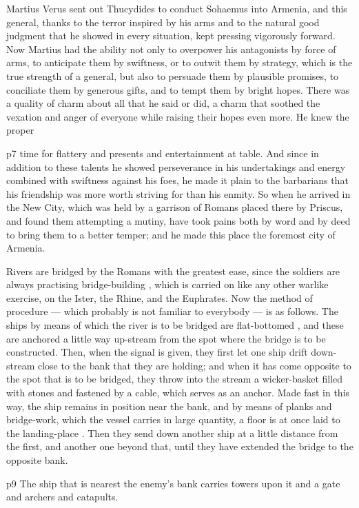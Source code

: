 Martius Verus sent out Thucydides to conduct Sohaemus into Armenia, and this general, thanks to the terror inspired by his arms and to the natural good judgment that he showed in every situation, kept pressing vigorously forward. Now Martius had the ability not only to overpower his antagonists by force of arms, to anticipate them by swiftness, or to outwit them by strategy, which is the true strength of a general, but also to persuade them by plausible promises, to conciliate them by generous gifts, and to tempt them by bright hopes. There was a quality of charm about all that he said or did, a charm that soothed the vexation and anger of everyone while raising their hopes even more. He knew the proper

p7 time for flattery and presents and entertainment at table. And since in addition to these talents he showed perseverance in his undertakings and energy combined with swiftness against his foes, he made it plain to the barbarians that his friendship was more worth striving for than his enmity. So when he arrived in the New City, which was held by a garrison of Romans placed there by Priscus, and found them attempting a mutiny, have took pains both by word and by deed to bring them to a better temper; and he made this place the foremost city of Armenia.

Rivers are bridged by the Romans with the greatest ease, since the soldiers are always practising bridge-building , which is carried on like any other warlike exercise, on the Ister, the Rhine, and the Euphrates. Now the method of procedure \texthebrew{—} which probably is not familiar to everybody \texthebrew{—} is as follows. The ships by means of which the river is to be bridged are flat-bottomed , and these are anchored a little way up-stream from the spot where the bridge is to be constructed. Then, when the signal is given, they first let one ship drift down-stream close to the bank that they are holding; and when it has come opposite to the spot that is to be bridged, they throw into the stream a wicker-basket filled with stones and fastened by a cable, which serves as an anchor. Made fast in this way, the ship remains in position near the bank, and by means of planks and bridge-work, which the vessel carries in large quantity, a floor is at once laid to the landing-place . Then they send down another ship at a little distance from the first, and another one beyond that, until they have extended the bridge to the opposite bank.

p9 The ship that is nearest the enemy's bank carries towers upon it and a gate and archers and catapults.

